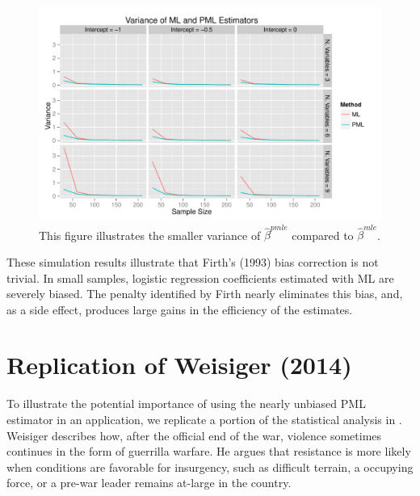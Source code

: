 \documentclass[12pt]{article}
\begin{document}
\begin{figure}[h]
\begin{center}
\includegraphics[width = \textwidth]{figs/sims-var.pdf}
\caption{This figure illustrates the smaller variance of $\hat{\beta}^{pmle}$ compared to $\hat{\beta}^{mle}$.}\label{fig:sims-var}
\end{center}
\end{figure}

These simulation results illustrate that Firth's (1993) bias correction is not trivial. 
In small samples, logistic regression coefficients estimated with ML are severely biased.
The penalty identified by Firth nearly eliminates this bias, and, as a side effect, produces large gains in the efficiency of the estimates. 

\section*{Replication of Weisiger (2014)}

To illustrate the potential importance of using the nearly unbiased PML estimator in an application, we replicate a portion of the statistical analysis in \cite{Weisiger2014}. 
Weisiger describes how, after the official end of the war, violence sometimes continues in the form of guerrilla warfare. 
He argues that resistance is more likely when conditions are favorable for insurgency, such as difficult terrain, a occupying force, or a pre-war leader remains at-large in the country. 

\end{document}
